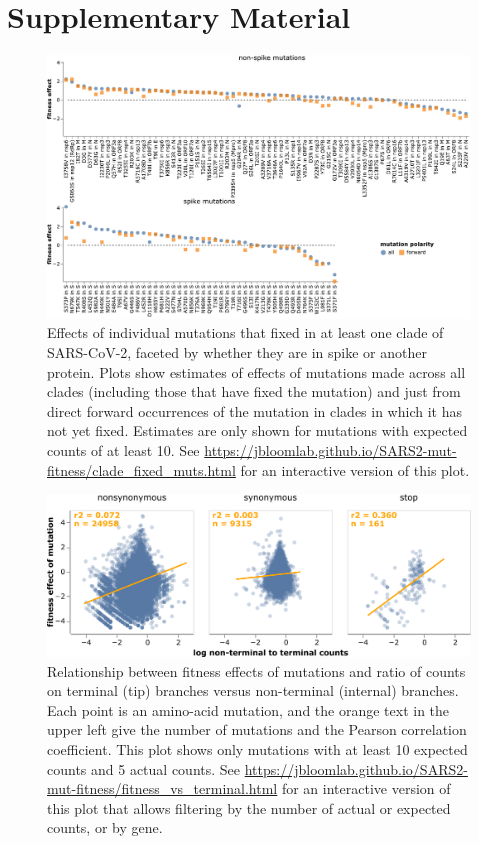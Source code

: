 \documentclass[9pt,twocolumn,twoside]{gsajnl_modified}
\begin{document}
\onecolumn
\renewcommand{\thepage}{S\arabic{page}}
\setcounter{page}{1}
\renewcommand{\thefigure}{S\arabic{figure}}
\setcounter{figure}{0}

\clearpage

\section{Supplementary Material}

\begin{figure}[b]
\includegraphics[width=\linewidth]{figs/fixed.pdf}
\caption{
Effects of individual mutations that fixed in at least one clade of SARS-CoV-2, faceted by whether they are in spike or another protein.
Plots show estimates of effects of mutations made across all clades (including those that have fixed the mutation) and just from direct forward occurrences of the mutation in clades in which it has not yet fixed.
Estimates are only shown for mutations with expected counts of at least 10.
See \url{https://jbloomlab.github.io/SARS2-mut-fitness/clade_fixed_muts.html} for an interactive version of this plot.
\label{fig:fixed}
}
\end{figure}


\begin{figure}
\centering
\includegraphics[width=0.75\linewidth]{figs/terminal.png}
\caption{
Relationship between fitness effects of mutations and ratio of counts on terminal (tip) branches versus non-terminal (internal) branches.
Each point is an amino-acid mutation, and the orange text in the upper left give the number of mutations and the Pearson correlation coefficient.
This plot shows only mutations with at least 10 expected counts and 5 actual counts.
See \url{https://jbloomlab.github.io/SARS2-mut-fitness/fitness_vs_terminal.html} for an interactive version of this plot that allows filtering by the number of actual or expected counts, or by gene.
\label{fig:terminal}
}
\end{figure}
\end{document}

